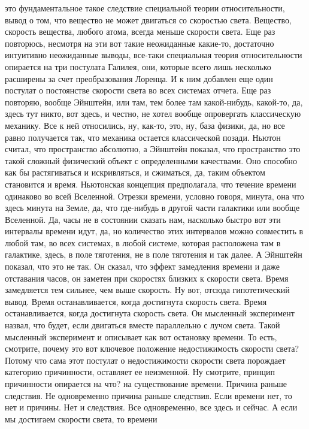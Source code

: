 это фундаментальное такое следствие специальной теории относительности, вывод о
том, что вещество не может двигаться со скоростью света. Вещество, скорость
вещества, любого атома, всегда меньше скорости света. Еще раз повторюсь,
несмотря на эти вот такие неожиданные какие-то, достаточно интуитивно
неожиданные выводы, все-таки специальная теория относительности опирается на три
постулата Галилея, они, которые всего лишь несколько расширены за счет
преобразования Лоренца. И к ним добавлен еще один постулат о постоянстве
скорости света во всех системах отчета. Еще раз повторяю, вообще Эйнштейн, или
там, тем более там какой-нибудь, какой-то, да, здесь тут никто, вот здесь, и
честно, не хотел вообще опровергать классическую механику. Все к ней относились,
ну, как-то, это, ну, база физики, да, но все равно получается так, что механика
остается классической позади. Ньютон считал, что пространство абсолютно, а
Эйнштейн показал, что пространство это такой сложный физический объект с
определенными качествами. Оно способно как бы растягиваться и искривляться, и
сжиматься, да, таким объектом становится и время. Ньютонская концепция
предполагала, что течение времени одинаково во всей Вселенной. Отрезки времени,
условно говоря, минута, она что здесь минута на Земле, да, что где-нибудь в
другой части галактики или вообще Вселенной. Да, часы не в состоянии сказать
нам, насколько быстро вот эти интервалы времени идут, да, но количество этих
интервалов можно совместить в любой там, во всех системах, в любой системе,
которая расположена там в галактике, здесь, в поле тяготения, не в поле
тяготения и так далее. А Эйнштейн показал, что это не так. Он сказал, что эффект
замедления времени и даже отставания часов, он заметен при скоростях близких к
скорости света. Время замедляется тем сильнее, чем выше скорость. Ну вот, отсюда
гипотетический вывод. Время останавливается, когда достигнута скорость света.
Время останавливается, когда достигнута скорость света. Он мысленный эксперимент
назвал, что будет, если двигаться вместе параллельно с лучом света. Такой
мысленный эксперимент и описывает как вот остановку времени. То есть, смотрите,
почему это вот ключевое положение недостижимость скорости света? Потому что сама
этот постулат о недостижимости скорости света порождает категорию причинности,
оставляет ее неизменной. Ну смотрите, принцип причинности опирается на что? на
существование времени. Причина раньше следствия. Не одновременно причина раньше
следствия. Если времени нет, то нет и причины. Нет и следствия. Все
одновременно, все здесь и сейчас. А если мы достигаем скорости света, то времени
